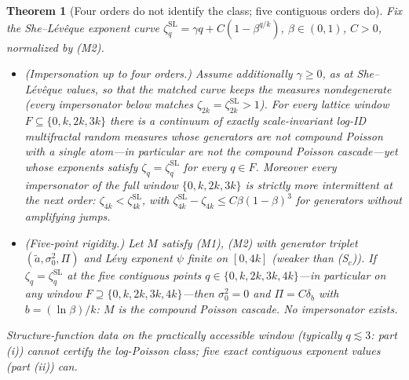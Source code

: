 \documentclass[pdflatex,sn-mathphys-num]{sn-jnl}
\theoremstyle{thmstyleone}
\newtheorem{theorem}{Theorem}
\theoremstyle{thmstyletwo}
\theoremstyle{thmstylethree}
\begin{document}
\begin{theorem}[Four orders do not identify the class; five
contiguous orders do]\label{thm:window}
Fix the She--L\'ev\^eque exponent curve $\zeta^{\mathrm{SL}}_q =
\gamma q + C(1-\beta^{q/k})$, $\beta \in (0,1)$, $C > 0$,
normalized by \textup{(M2)}.
\begin{itemize}
\item[\textup{(i)}] \textup{(Impersonation up to four orders.)}
  Assume additionally $\gamma \ge 0$, as at She--L\'ev\^eque values,
  so that the matched curve keeps the measures nondegenerate (every
  impersonator below matches $\zeta_{2k} = \zeta^{\mathrm{SL}}_{2k} > 1$).
  For every lattice window $F \subseteq \{0, k, 2k, 3k\}$ there is
  a continuum of exactly scale-invariant log-ID multifractal random
  measures whose generators are not compound Poisson with a single
  atom---in particular are not the compound Poisson cascade---yet
  whose exponents satisfy $\zeta_q = \zeta^{\mathrm{SL}}_q$ for
  every $q \in F$.  Moreover every impersonator of the full window
  $\{0,k,2k,3k\}$ is strictly \emph{more} intermittent at the next
  order: $\zeta_{4k} < \zeta^{\mathrm{SL}}_{4k}$, with
  $\zeta^{\mathrm{SL}}_{4k} - \zeta_{4k} \le C\beta(1-\beta)^3$
  for generators without amplifying jumps.
\item[\textup{(ii)}] \textup{(Five-point rigidity.)}  Let $M$
  satisfy \textup{(M1)}, \textup{(M2)} with generator triplet
  $(\tilde a, \sigma_0^2, \Pi)$ and L\'evy exponent $\psi$ finite
  on $[0, 4k]$ (weaker than \textup{(S$_c$)}).  If $\zeta_q =
  \zeta^{\mathrm{SL}}_q$ at the five contiguous points $q \in
  \{0, k, 2k, 3k, 4k\}$---in particular on any window $F \supseteq
  \{0, k, 2k, 3k, 4k\}$---then $\sigma_0^2 = 0$ and $\Pi = C\delta_b$
  with $b = (\ln\beta)/k$: $M$ \emph{is} the compound Poisson
  cascade.  No impersonator exists.
\end{itemize}
Structure-function data on the practically accessible window
(typically $q \lesssim 3$: part \textup{(i)}) cannot certify the
log-Poisson class; five
exact contiguous exponent values (part \textup{(ii)}) can.
\end{theorem}
\end{document}
